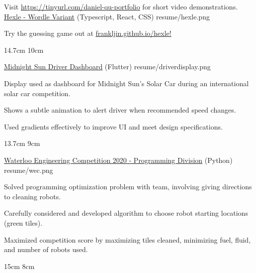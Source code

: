 

\begin{cventries}

  Visit \href{https://docs.google.com/document/d/e/2PACX-1vS0EqgEdK7blzAP3eqhoXZXuYXNIMIreo-fD56--8hDs616NmmvpaythZmCKw7Pt4CDEAfRSdoIxmMB/pub}{https://tinyurl.com/daniel-qu-portfolio} for short video demonstrations.
  \\%
  \portfolioEntry
    {\href{https://frankljin.github.io/hexle/}{Hexle - Wordle Variant} (Typescript, React, CSS)} %
    {resume/hexle.png} %
    {
      \begin{cvitems} %
        \item {Try the guessing game out at \href{https://frankljin.github.io/hexle/}{\underline{frankljin.github.io/hexle}!}}
      \end{cvitems}
    }
    {14.7cm}
    {10cm}

  \portfolioEntry
    {\href{https://github.com/uw-midsun/telemetry_xiv}{Midnight Sun Driver Dashboard} (Flutter)} %
    {resume/driverdisplay.png} %
    {
      \begin{cvitems} %
        \item {Display used as dashboard for Midnight Sun's Solar Car during an international solar car competition.}
        \item {Shows a subtle animation to alert driver when recommended speed changes.}
        \item {Used gradients effectively to improve UI and meet design specifications.}
      \end{cvitems}
    }
    {13.7cm}
    {9cm}

  \newpage

  \portfolioEntry
    {\href{https://github.com/danielq987/WECF2020}{Waterloo Engineering Competition 2020 - Programming Division} (Python)} %
    {resume/wec.png} %
    {
      \begin{cvitems} %
        \item {Solved programming optimization problem with team, involving giving directions to cleaning robots.}
        \item {Carefully considered and developed algorithm to choose robot starting locations (green tiles).}
        \item {Maximized competition score by maximizing tiles cleaned, minimizing fuel, fluid, and number of robots used.}
      \end{cvitems}
    }
    {15cm}
    {8cm}
  


\end{cventries}
